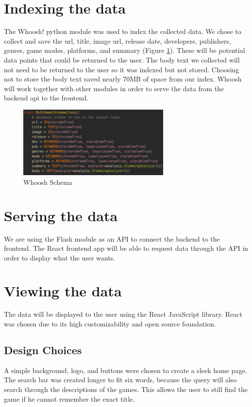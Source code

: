 \section{Indexing the data}
The Whoosh! python module was used to index the collected data. We chose to collect and save the url, title, image url, release date, developers, publishers, genres, game modes, platforms, and summary (Figure \ref{fig:whooshschema}). These will be potential data points that could be returned to the user. The body text we collected will not need to be returned to the user so it was indexed but not stored. Choosing not to store the body text saved nearly 70MB of space from our index. Whoosh will work together with other modules in order to serve the data from the backend api to the frontend.

\begin{figure}[h]
\includegraphics[width=3in]{whooshSchema}
\caption{Whoosh Schema}
\label{fig:whooshschema}
\end{figure}

\section{Serving the data}
We are using the Flask module as an API to connect the backend to the frontend. The React frontend app will be able to request data through the API in order to display what the user wants.

\section{Viewing the data}
The data will be displayed to the user using the React JavaScript library. React was chosen due to its high customizability and open source foundation. 

\subsection{Design Choices}
A simple background, logo, and buttons were chosen to create a sleek home page. The search bar was created longer to fit six words, because the query will also search through the descriptions of the games. This allows the user to still find the game if he cannot remember the exact title. 

